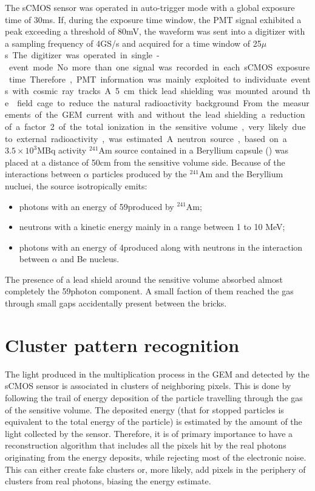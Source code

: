 \documentclass[12pt]{iopart}
\begin{document}
The sCMOS sensor was operated in auto-trigger mode with a global
exposure time of 30\unit{ms}.  If, during the exposure time window,
the PMT signal exhibited a peak exceeding a threshold of 80\unit{mV},
the waveform was sent into a digitizer with a sampling frequency of
4\unit{GS/s} and acquired for a time window of 25\unit{$\mu$s}. The
digitizer was operated in single-event mode. No more than one signal
was recorded in each sCMOS exposure time. Therefore, PMT information
was mainly exploited to individuate events with cosmic ray tracks.

A 5\unit{cm} thick lead shielding was mounted around the \lemon field
cage to reduce the natural radioactivity background. From the
measurements of the GEM current with and without the lead shielding a
reduction of a factor 2 of the total ionization in the sensitive
volume, very likely due to external radioactivity, was estimated.

A neutron source, based on a $3.5\times10^3$\unit{MBq} activity
$^{241}$Am source contained in a Beryllium capsule (\ambe) was placed
at a distance of 50\unit{cm} from the sensitive volume side.  Because
of the interactions between $\alpha$ particles produced by the
$^{241}$Am and the Beryllium nucluei, the \ambe source isotropically
emits:
 \begin{itemize}
     \item photons with an energy of 59\keV produced by $^{241}$Am;
     \item neutrons with a kinetic energy mainly in a range between 1 to 10 MeV;
     \item photons with an energy of 4\MeV produced along with
       neutrons in the interaction between $\alpha$ and Be nucleus.
 \end{itemize}
The presence of a lead shield around the sensitive volume absorbed
almost completely the 59\keV photon component. A small faction of them
reached the gas through small gaps accidentally present between the
bricks.
 

\clearpage
 
\section{Cluster pattern recognition}
\label{sec:clustering}
The light produced in the multiplication process in the GEM and
detected by the sCMOS sensor is associated in clusters of neighboring
pixels. This is done by following the trail of energy deposition of
the particle travelling through the gas of the sensitive volume. The
deposited energy (that for stopped particles is equivalent to the
total energy of the particle) is estimated by the amount of the light
collected by the sensor.  Therefore, it is of primary importance to
have a reconstruction algorithm that includes all the pixels hit by
the real photons originating from the energy deposits, while rejecting
most of the electronic noise. This can either create fake clusters or,
more likely, add pixels in the periphery of clusters from real
photons, biasing the energy estimate.
\end{document}
